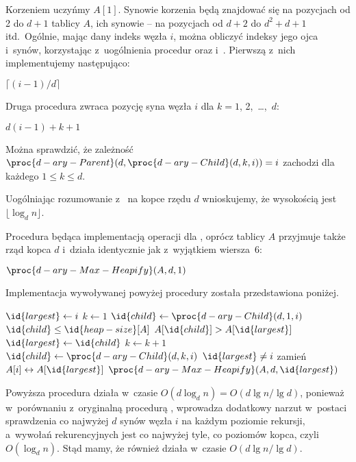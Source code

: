 
\subproblem %
Korzeniem  uczyńmy $A[1]$. Synowie korzenia będą znajdować się na pozycjach od 2 do $d+1$ tablicy $A$, ich synowie -- na pozycjach od $d+2$ do $d^2+d+1$ itd.\ Ogólnie, mając dany indeks węzła $i$, można obliczyć indeksy jego ojca i~synów, korzystając z~uogólnienia procedur  oraz  i~. Pierwszą z~nich implementujemy następująco:
\begin{codebox}
\li	\Return $\lceil(i-1)/d\rceil$
\end{codebox}
Druga procedura zwraca pozycję  syna węzła $i$ dla $k=1$, 2,~\dots,~$d$:
\begin{codebox}
\li	\Return $d(i-1)+k+1$
\end{codebox}
Można sprawdzić, że zależność $\proc{d-ary-Parent}(d,\proc{d-ary-Child}(d,k,i))=i$ zachodzi dla każdego $1\le k\le d$.

\subproblem %
Uogólniając rozumowanie z~ na kopce rzędu $d$ wnioskujemy, że wysokością  jest $\lfloor\log_dn\rfloor$.

\subproblem %
Procedura  będąca implementacją operacji  dla , oprócz tablicy $A$ przyjmuje także rząd kopca $d$ i~działa identycznie jak  z~wyjątkiem wiersza~6:
\begin{codebox}
\setcounter{codelinenumber}{5}
\li	$\proc{d-ary-Max-Heapify}(A,d,1)$
\end{codebox}
Implementacja wywoływanej powyżej procedury została przedstawiona poniżej.
\begin{codebox}
\li	$\id{largest}\gets i$
\li	$k\gets1$
\li	$\id{child}\gets\proc{d-ary-Child}(d,1,i)$
\li	\While $\id{child}\le\id{heap-size}[A]$
\li		\Do
			\If $A[\id{child}]>A[\id{largest}]$
\li				\Then $\id{largest}\gets\id{child}$
				\End
\li			$k\gets k+1$
\li			$\id{child}\gets\proc{d-ary-Child}(d,k,i)$
		\End
\li	\If $\id{largest}\ne i$
\li		\Then
			zamień $A[i]\leftrightarrow A[\id{largest}]$
\li			$\proc{d-ary-Max-Heapify}(A,d,\id{largest})$
		\End
\end{codebox}
Powyższa procedura działa w~czasie $O(d\log_dn)=O(d\lg n/\!\lg d)$, ponieważ w~porównaniu z~oryginalną procedurą , wprowadza dodatkowy narzut w~postaci sprawdzenia co najwyżej $d$ synów węzła $i$ na każdym poziomie rekursji, a~wywołań rekurencyjnych jest co najwyżej tyle, co poziomów kopca, czyli $O(\log_dn)$. Stąd mamy, że również  działa w~czasie $O(d\lg n/\!\lg d)$.

